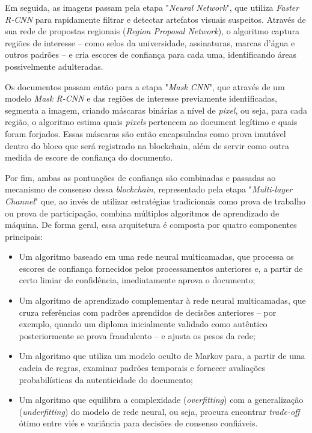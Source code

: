 Em seguida, as imagens passam pela etapa "\textit{Neural Network}", que utiliza \textit{Faster R-CNN} para rapidamente filtrar e detectar artefatos visuais suspeitos. Através de sua rede de propostas regionais (\textit{Region Proposal Network}), o algoritmo captura regiões de interesse -- como selos da universidade, assinaturas, marcas d'água e outros padrões -- e cria escores de confiança para cada uma, identificando áreas possivelmente adulteradas.

Os documentos passam então para a etapa "\textit{Mask CNN}", que através de um modelo \textit{Mask R-CNN} e das regiões de interesse previamente identificadas, segmenta a imagem, criando máscaras binárias a nível de \textit{pixel}, ou seja, para cada região, o algoritmo estima quais \textit{pixels} pertencem ao document legítimo e quais foram forjados. Essas máscaras são então encapsuladas como prova imutável dentro do bloco que será registrado na blockchain, além de servir como outra medida de escore de confiança do documento.

Por fim, ambas as pontuações de confiança são combinadas e passadas ao mecanismo de consenso dessa \textit{blockchain}, representado pela etapa "\textit{Multi-layer Channel}" que, ao invés de utilizar estratégias tradicionais como prova de trabalho ou prova de participação, combina múltiplos algoritmos de aprendizado de máquina. De forma geral, essa arquitetura é composta por quatro componentes principais:

\begin{itemize}
    \item Um algoritmo baseado em uma rede neural multicamadas, que processa os escores de confiança fornecidos pelos processamentos anteriores e, a partir de certo limiar de confidência, imediatamente aprova o documento;
    \item Um algoritmo de aprendizado complementar à rede neural multicamadas, que cruza referências com padrões aprendidos de decisões anteriores -- por exemplo, quando um diploma inicialmente validado como autêntico posteriormente se prova fraudulento -- e ajusta os pesos da rede;
    \item Um algoritmo que utiliza um modelo oculto de Markov para, a partir de uma cadeia de regras, examinar padrões temporais e fornecer avaliações probabilísticas da autenticidade do documento;
    \item Um algoritmo que equilibra a complexidade (\textit{overfitting}) com a generalização (\textit{underfitting}) do modelo de rede neural, ou seja, procura encontrar \textit{trade-off} ótimo entre viés e variância para decisões de consenso confiáveis.
\end{itemize}

